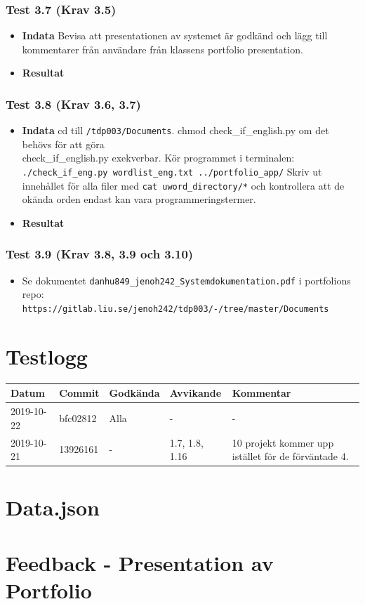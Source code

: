 \documentclass{TDP003mall}
\begin{document}
\subsubsection*{Test 3.7 (Krav 3.5)}
\begin{itemize}
\item[]\textbf{Indata} Bevisa att presentationen av systemet är godkänd och lägg till kommentarer från användare från klassens portfolio presentation.
\item[]\textbf{Resultat} %
\end{itemize}
\subsubsection*{Test 3.8 (Krav 3.6, 3.7)}
\begin{itemize}
\item[]\textbf{Indata} cd till \texttt{/tdp003/Documents}. chmod check\_if\_english.py om det behövs för att göra \\check\_if\_english.py exekverbar. Kör programmet i terminalen: \texttt{./check\_if\_eng.py wordlist\_eng.txt ../portfolio\_app/} Skriv ut innehållet för alla filer med \texttt{cat uword\_directory/*} och kontrollera att de okända orden endast kan vara programmeringstermer.
\item[]\textbf{Resultat} 
\end{itemize}
\subsubsection*{Test 3.9 (Krav 3.8, 3.9 och 3.10)}
\begin{itemize}
\item[] Se dokumentet \texttt{danhu849\_jenoh242\_Systemdokumentation.pdf} i portfolions repo:\\
  \texttt{https://gitlab.liu.se/jenoh242/tdp003/-/tree/master/Documents}
\end{itemize}





\section{Testlogg}

\begin{tabular}{|l|l|l|l|l|}
  \hline
  Datum & Commit & Godkända & Avvikande & Kommentar \\ [0.5ex]
  \hline
  2019-10-22 & bfc02812 & Alla & - & - \\
  \hline
  \hline
  2019-10-21 & 13926161 & - & 1.7, 1.8, 1.16 &10 projekt kommer upp istället för de förväntade 4.\\
  \hline
  \hline
\end{tabular}

\appendix
\section{Data.json}
\section{Feedback - Presentation av Portfolio}
\end{document}
